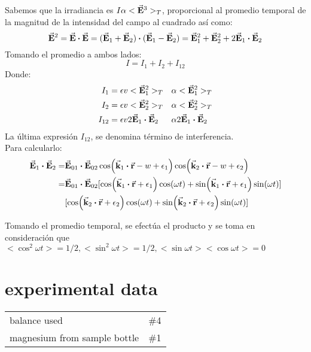 \documentclass{article}
\begin{document}
  Sabemos que la irradiancia es $I \alpha <\va{E}^3>_T$, proporcional al promedio temporal
  de la magnitud de la intensidad del campo al cuadrado así como:
  \begin{equation}
    \label{eq:3}
    \va{E}^2 = \va{E}\dotproduct\va{E} = ( \va{E}_1 + \va{E}_2 )\dotproduct( \va{E}_1 -  \va{E}_2 ) = \va{E}_1^2 + \va{E}_2^2 + 2\va{E}_1\dotproduct\va{E}_2 
  \end{equation}
  Tomando el promedio a ambos lados:
  $$ I = I_1 + I_2 + I_{12}$$
  Donde:
  \begin{equation}
    \label{eq:4}
    \begin{aligned}
      I_1& = \epsilon v <\va{E}_1^2>_T & \alpha &<\va{E}_1^2>_T \\
      I_2& = \epsilon v <\va{E}_2^2>_T & \alpha &<\va{E}_2^2>_T \\
      I_{12}& = \epsilon v 2\va{E}_1\dotproduct\va{E}_2 & \alpha &2\va{E}_1\dotproduct\va{E}_2\\
    \end{aligned}
  \end{equation}
  La última expresión $I_{12}$, se denomina término de interferencia.
  \\
  Para calcularlo:
  \begin{equation}
    \label{eq:5}
    \begin{aligned}
      \va{E}_1\dotproduct\va{E}_2 =& \va{E}_{01}\dotproduct\va{E}_{02}\cos(\va{k}_1\dotproduct\va{r} - w + \epsilon_1)\cos(\va{k}_2\dotproduct\va{r} - w + \epsilon_2) \\
      =& \va{E}_{01}\dotproduct\va{E}_{02}[\cos(\va{k}_1\dotproduct\va{r} + \epsilon_1)\cos(\omega t) + \sin(\va{k}_1\dotproduct\va{r} + \epsilon_1)\sin(\omega t)]
      \\ & [\cos(\va{k}_2\dotproduct\va{r} + \epsilon_2)\cos(\omega t) + \sin(\va{k}_2\dotproduct\va{r} + \epsilon_2)\sin(\omega t)]
    \end{aligned}
  \end{equation}

  Tomando el promedio temporal, se efectúa el producto y se toma en consideración que
  $<\cos^2\omega t> = 1/2, <\sin^2\omega t> = 1/2, <\sin\omega t><\cos\omega t> = 0$
  
 

\section{experimental data}
\begin{tabular}{|l|l|}
  balance used & \#4\\
  magnesium from sample bottle & \#1
\end{tabular}
\end{document}
